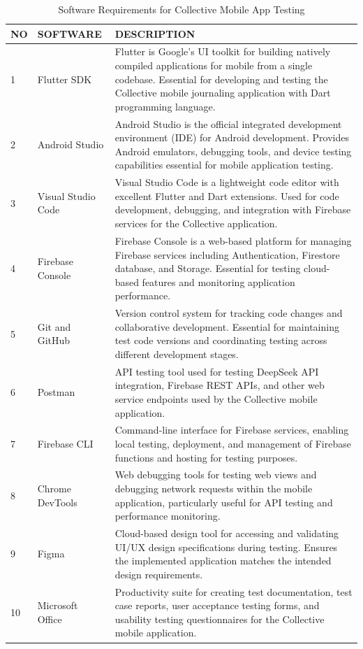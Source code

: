 \begin{table}[H]
\centering
\caption{Software Requirements for Collective Mobile App Testing}
\label{tab:software-requirements}
\begin{tabular}{|p{1cm}|p{4cm}|p{9cm}|}
\hline
\textbf{NO} & \textbf{SOFTWARE} & \textbf{DESCRIPTION} \\
\hline
1 & Flutter SDK & Flutter is Google's UI toolkit for building natively compiled applications for mobile from a single codebase. Essential for developing and testing the Collective mobile journaling application with Dart programming language. \\
\hline
2 & Android Studio & Android Studio is the official integrated development environment (IDE) for Android development. Provides Android emulators, debugging tools, and device testing capabilities essential for mobile application testing. \\
\hline
3 & Visual Studio Code & Visual Studio Code is a lightweight code editor with excellent Flutter and Dart extensions. Used for code development, debugging, and integration with Firebase services for the Collective application. \\
\hline
4 & Firebase Console & Firebase Console is a web-based platform for managing Firebase services including Authentication, Firestore database, and Storage. Essential for testing cloud-based features and monitoring application performance. \\
\hline
5 & Git and GitHub & Version control system for tracking code changes and collaborative development. Essential for maintaining test code versions and coordinating testing across different development stages. \\
\hline
6 & Postman & API testing tool used for testing DeepSeek API integration, Firebase REST APIs, and other web service endpoints used by the Collective mobile application. \\
\hline
7 & Firebase CLI & Command-line interface for Firebase services, enabling local testing, deployment, and management of Firebase functions and hosting for testing purposes. \\
\hline
8 & Chrome DevTools & Web debugging tools for testing web views and debugging network requests within the mobile application, particularly useful for API testing and performance monitoring. \\
\hline
9 & Figma & Cloud-based design tool for accessing and validating UI/UX design specifications during testing. Ensures the implemented application matches the intended design requirements. \\
\hline
10 & Microsoft Office & Productivity suite for creating test documentation, test case reports, user acceptance testing forms, and usability testing questionnaires for the Collective mobile application. \\
\hline
\end{tabular}
\end{table}

